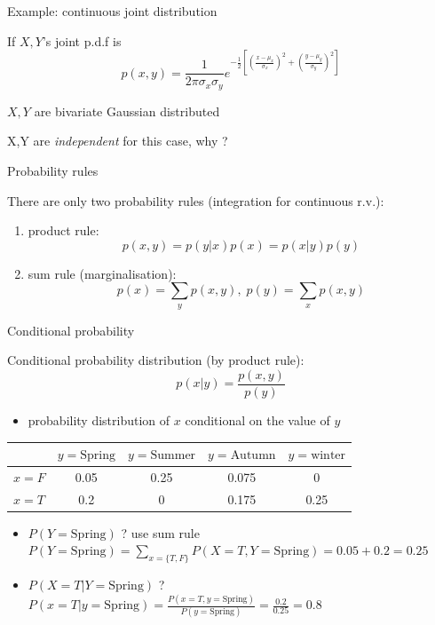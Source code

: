 \documentclass[ignorenonframetext,]{beamer}
\providecommand{\tightlist}{%
  \setlength{\itemsep}{0pt}\setlength{\parskip}{0pt}}
\begin{document}
\begin{frame}{Example: continuous joint distribution}
\protect\hypertarget{example-continuous-joint-distribution}{}

If \(X,Y\)'s joint p.d.f is
\[p(x,y) = \frac{1}{2\pi\sigma_x\sigma_y} e^{-\frac{1}{2}[(\frac{x-\mu_x}{\sigma_x})^2 +(\frac{y-\mu_y}{\sigma_y})^2] }\]

\(X,Y\) are bivariate Gaussian distributed

\bigskip

X,Y are \emph{independent} for this case, why ?

\end{frame}

\begin{frame}{Probability rules}
\protect\hypertarget{probability-rules}{}

There are only two probability rules (integration for continuous r.v.):

\begin{enumerate}
    \item product rule: \[ p(x, y) = p (y|x)p(x) = p(x|y)p(y)\]
    \item sum rule (marginalisation): \[ p (x) = \sum_y p(x, y),\; p(y) = \sum_x p(x, y)\]
\end{enumerate}

\end{frame}

\begin{frame}{Conditional probability}
\protect\hypertarget{conditional-probability}{}

Conditional probability distribution (by product rule):
\[p (x| y) = \frac{p(x, y)}{p(y)}\]

\begin{itemize}
\tightlist
\item
  probability distribution of \(x\) conditional on the value of \(y\)
\end{itemize}

\bigskip

\begin{table}\centering
\begin{tabular}{ l | c | c | c | c}
   \centering                    
   & $y=\text{Spring}$ & $y=\text{Summer}$ &$y=\text{Autumn}$ & $y=\text{winter}$\\ 
   \hline
  $x= F$ & 0.05 & 0.25 & 0.075& 0\\
    \hline 
  $x= T$ & 0.2 & 0 & 0.175& 0.25\\ 
\end{tabular}
\end{table}

\bigskip

\begin{itemize}
\item
  \(P(Y= \text{Spring})\) ? use sum rule
  \(P(Y = \text{Spring}) = \sum_{x=\{T,F\}} P(X=T,Y=\text{Spring}) =0.05+0.2=0.25\)
\item
  \(P(X=T | Y= \text{Spring})\) ?
  \(P(x=T | y = \text{Spring}) = \frac{P(x=T, y=\text{Spring})}{P(y=\text{Spring})}=\frac{0.2}{0.25}=0.8\)
\end{itemize}

\end{frame}
\end{document}
